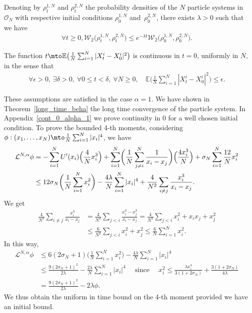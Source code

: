 \begin{assumption}\label{Hyp_long_time_cv}
Denoting by $\rho^{1,N}_t$ and $\rho^{2,N}_t$ the probability densities of the $N$ particle systems in $\mathcal{O}_N$ with respective initial conditions $\rho^{1,N}_0$ and~$\rho^{2,N}_0$, there exists $\lambda>0$ such that we have
\begin{align*}
\forall t\geq0, \mathcal{W}_2\bigl(\rho^{1,N}_t,\rho^{2,N}_t\bigr)\leq e^{-\lambda t}\mathcal{W}_2\bigl(\rho^{1,N}_0,\rho^{2,N}_0\bigr).
\end{align*}
\end{assumption}

\begin{assumption}[Continuity in 0]\label{Hyp_cont}
The function $t\mto\mathbb{E}\bigl(\frac{1}{N}\sum_{i=1}^N|X^i_t-X^i_0|^2\bigr)$ is continuous in $t=0$, uniformly in $N$, in the sense that
\begin{align*}
\forall \epsilon>0,\ \exists \delta>0,\ \forall 0\leq t<\delta,\ \forall N\geq0,\quad \mathbb{E}\biggl(\frac{1}{N}\sum_{i=1}^N|X^i_t-X^i_0|^2\biggr)\leq\epsilon.
\end{align*}
\end{assumption}

\begin{remark}
These assumptions are satisfied in the case $\alpha=1$. We have shown in Theorem~\ref{long_time_beha} the long time convergence of the particle system. In Appendix~\ref{cont_0_alpha_1} we prove continuity in 0 for a well chosen initial condition. To prove the bounded 4-th moments, considering $\phi:(x_1,\dots,x_N)\mto \frac{1}{N}\sum_{i=1}^N|x_i|^4$, we have
\begin{align*}
\mathcal{L}^{N,\alpha}\phi&=-\sum_{i=1}^NU'(x_i)\Bigl(\frac{4}{N}x_i^3\Bigr)+\sum_{i=1}^N\biggl(\frac{1}{N}\sum_{j\neq i}^N\frac{1}{x_i-x_j}\biggr)\Bigl(\frac{4x_i^3}{N}\Bigr)+\sigma_N\sum_{i=1}^N \frac{12}{N}x_i^2\\
&\leq 12\sigma_N\biggl(\frac{1}{N}\sum_{i=1}^N x_i^2\biggr)-\frac{4\lambda}{N}\sum_{i=1}^N|x_i|^4+\frac{4}{N^2}\sum_{i\neq j}\frac{x_i^3}{x_i-x_j}.
\end{align*}
We get
\begin{align*}
\frac{4}{N^2}\sum_{i\neq j}\frac{x_i^3}{x_i-x_j}&=\frac{4}{N^2}\sum_{j< i}\frac{x_i^3-x_j^3}{x_i-x_j}=\frac{4}{N^2}\sum_{j< i}x_i^2+x_ix_j+x_j^2\\
&\leq\frac{6}{N^2}\sum_{j< i}x_i^2+x_j^2\leq\frac{6}{N}\sum_{i=1}^Nx_i^2.
\end{align*}
In this way,
\begin{align*}
\mathcal{L}^{N,\alpha}\phi&\leq 6\left(2\sigma_N+1\right)\biggl(\frac{1}{N}\sum_{i=1}^N x_i^2\biggr)-\frac{4\lambda}{N}\sum_{i=1}^N|x_i|^4\\
&\leq \frac{9\left(2\sigma_N+1\right)^2}{2\lambda}-\frac{2\lambda}{N}\sum_{i=1}^N|x_i|^4\quad \text{ since }\quad x_i^2\leq \frac{\lambda x_i^4}{3(1+2\sigma_N)}+\frac{3(1+2\sigma_N)}{4\lambda }\\
&=\frac{9\left(2\sigma_N+1\right)^2}{2\lambda}-2\lambda\phi.
\end{align*}
We thus obtain the uniform in time bound on the 4-th moment provided we have an initial bound.
\end{remark}

